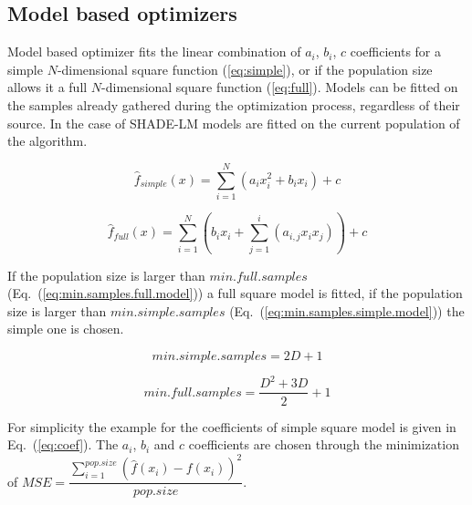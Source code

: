 \documentclass[sigconf]{acmart}
\begin{document}
\subsection{Model based optimizers}

Model based optimizer fits the linear combination
of $a_i$, $b_i$, $c$ coefficients for a simple
$N$-dimensional square function (\ref{eq:simple}), or if the population
size allows it a full $N$-dimensional square function (\ref{eq:full}).
Models can be fitted on the samples already gathered during the optimization process,
regardless of their source.
In the case of SHADE-LM models are fitted on the current population of the algorithm.

\begin{equation}
	\hat{f}_{simple}(x) = \sum\limits_{i=1}^{N}(a_ix_i^2 + b_ix_i) + c
	\label{eq:simple}
\end{equation}

\begin{equation}
	\hat{f}_{full}(x) = \sum\limits_{i=1}^{N} \left( b_ix_i + \sum\limits_{j=1}^{i}(a_{i,j}x_ix_j )\right) + c
	\label{eq:full}
\end{equation}

If the population size is larger than $min.full.samples$ (Eq.~(\ref{eq:min.samples.full.model}))
a full square model is fitted, if the population size is larger than $min.simple.samples$
(Eq.~(\ref{eq:min.samples.simple.model})) the simple one is chosen.

\begin{equation}
	min.simple.samples = 2D + 1
	\label{eq:min.samples.simple.model}
\end{equation}

\begin{equation}
	min.full.samples = \dfrac{D^2+ 3D}{2} + 1
	\label{eq:min.samples.full.model}
\end{equation}

For simplicity the example for the coefficients of simple square model is given in Eq.~(\ref{eq:coef}). The $a_i$, $b_i$ and $c$ coefficients are chosen through the minimization of $MSE = \dfrac{\sum\limits_{i=1}^{pop.size}(\hat{f}(x_i)-f(x_i))^2}{pop.size}$.
\end{document}
